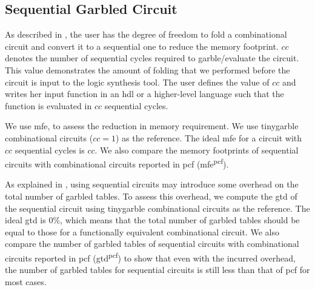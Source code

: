 \subsection{Sequential Garbled Circuit}\label{ssec:eval-tinygarble-seq}
As described in , the user has the degree of freedom to fold a combinational circuit and convert it to a sequential one to reduce the memory footprint.
$cc$ denotes the number of sequential cycles required to garble/evaluate the circuit.
This value demonstrates the amount of folding that we performed before the circuit is input to the logic synthesis tool.
The user defines the value of $cc$ and writes her input function in an \acrfull{hdl} or a higher-level language such that the function is evaluated in $cc$ sequential cycles.

We use \acrfull{mfe}, to assess the reduction in memory requirement.
We use \gls{tinygarble} combinational circuits ($cc=1$) as the reference.
The ideal \acrshort{mfe} for a circuit with $cc$ sequential cycles is $cc$.
We also compare the memory footprints of sequential circuits with combinational circuits reported in \gls{pcf} (\acrshort{mfe}\textsuperscript{\gls{pcf}}).

As explained in , using sequential circuits may introduce some overhead on the total number of garbled tables.
To assess this overhead, we compute the \acrshort{gtd} of the sequential circuit using \gls{tinygarble} combinational circuits as the reference.
The ideal \acrshort{gtd} is $0\%$, which means that the total number of garbled tables should be equal to those for a functionally equivalent combinational circuit.
We also compare the number of garbled tables of sequential circuits with combinational circuits reported in \gls{pcf} (\acrshort{gtd}\textsuperscript{\gls{pcf}}) to show that even with the incurred overhead, the number of garbled tables for sequential circuits is still less than that of \gls{pcf} for most cases.

